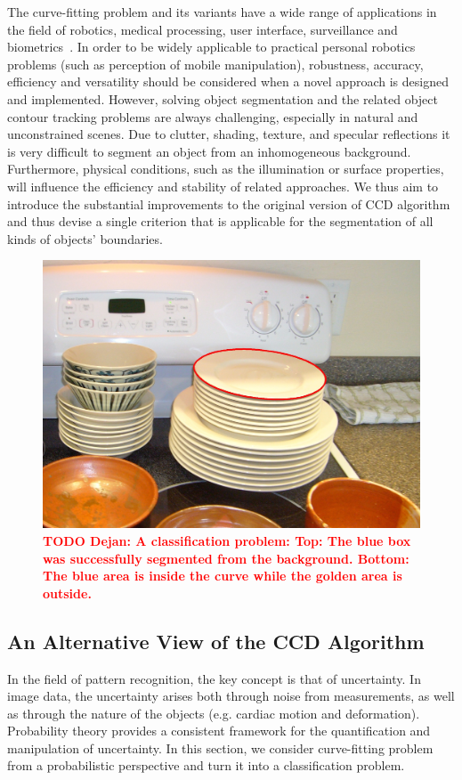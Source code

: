 \documentclass[conference]{IEEEtran}
\newcommand{\todod}[1]{\textbf{\textcolor{red}{TODO Dejan: #1}}}
\begin{document}
The curve-fitting problem and its variants have a wide range of
applications in the field of robotics, medical processing, user
interface, surveillance and biometrics~\cite{hanek2004fitting}. In order to be
widely applicable to practical personal robotics problems (such as
perception of mobile manipulation), robustness,
accuracy, efficiency and versatility should be
considered when a novel approach is designed and implemented.
However, solving object segmentation and the
related object contour tracking problems are always challenging,
especially in natural and unconstrained scenes. Due to clutter,
shading, texture, and specular reflections it is very difficult to segment
an object from an inhomogeneous background. Furthermore, physical
conditions, such as the illumination or surface properties, will
influence the efficiency and stability of related approaches. 
We thus aim to introduce the substantial improvements to the original
version of CCD algorithm and thus devise a single criterion that is 
applicable for the segmentation of all kinds of objects' boundaries.

\begin{figure}[htbp]
  \centering
  \includegraphics[width=\columnwidth]{experiments/dishes.jpg}
  \caption{\todod{A classification problem: \textbf{Top:} The blue box was successfully segmented
    from the background. \textbf{Bottom:} The blue area is inside the curve while
    the golden area is outside.}}
  \label{fig:divide}
\end{figure}

\subsection{An Alternative View of the CCD Algorithm}
\label{sec:overview}
In the field of pattern recognition, the key concept is that of
uncertainty. In image data, the uncertainty arises both
through noise from measurements, as well as through the nature of
the objects (e.g. cardiac motion and deformation). Probability theory
provides a consistent framework for the quantification and
manipulation of uncertainty.  In this section, we consider curve-fitting
problem from a probabilistic perspective and turn it into
a classification problem.
\end{document}
